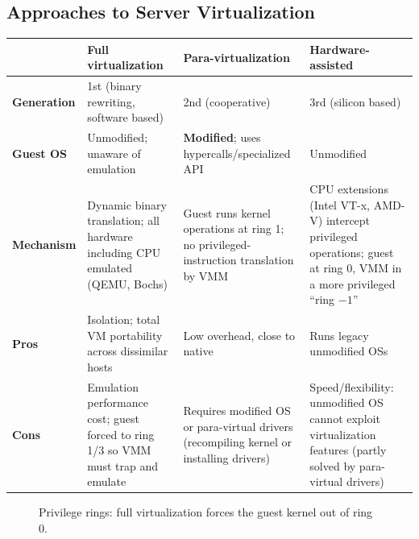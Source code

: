 \documentclass[11pt,a4paper,openany]{report}
\begin{document}
\subsection{Approaches to Server Virtualization}
\begin{center}
\begin{tabularx}{\textwidth}{>{\bfseries}lXXX}
\toprule
 & Full virtualization & Para-virtualization & Hardware-assisted\\
\midrule
Generation & 1st (binary rewriting, software based) & 2nd (cooperative) & 3rd (silicon based)\\
Guest OS & Unmodified; unaware of emulation & \textbf{Modified}; uses hypercalls/specialized API &
Unmodified\\
Mechanism & Dynamic binary translation; all hardware including CPU emulated (QEMU, Bochs) & Guest runs
kernel operations at ring 1; no privileged-instruction translation by VMM & CPU extensions (Intel VT-x,
AMD-V) intercept privileged operations; guest at ring 0, VMM in a more privileged ``ring $-1$''\\
Pros & Isolation; total VM portability across dissimilar hosts & Low overhead, close to native & Runs
legacy unmodified OSs\\
Cons & Emulation performance cost; guest forced to ring 1/3 so VMM must trap and emulate & Requires modified OS or
para-virtual drivers (recompiling kernel or installing drivers) & Speed/flexibility: unmodified OS cannot
exploit virtualization features (partly solved by para-virtual drivers)\\
\bottomrule
\end{tabularx}
\end{center}

\begin{figure}[H]
\centering
{}
\caption{Privilege rings: full virtualization forces the guest kernel out of ring 0.}
\end{figure}
\end{document}
